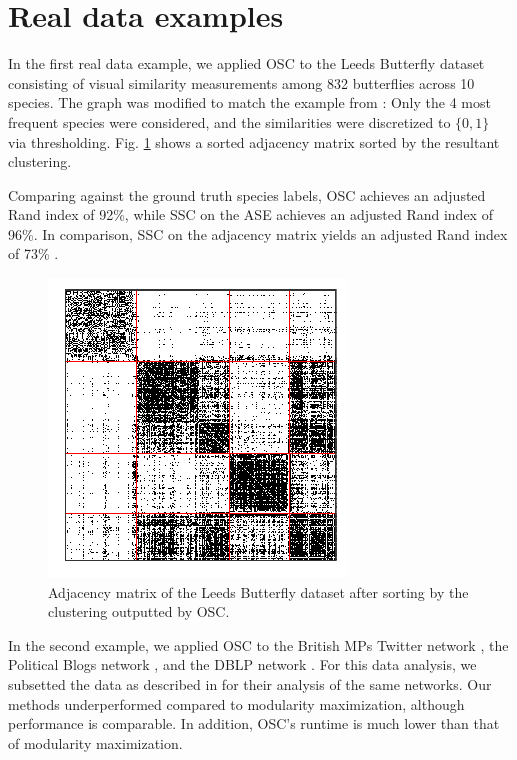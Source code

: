 \documentclass[12pt]{article}
\begin{document}
\hypertarget{real-data-examples}{%
\section{Real data examples}\label{real-data-examples}}

In the first real data example, we applied OSC to the Leeds Butterfly
dataset \cite{Wang_2018} consisting of visual similarity measurements
among 832 butterflies across 10 species. The graph was modified to match
the example from \cite{noroozi2019estimation}: Only the 4 most
frequent species were considered, and the similarities were discretized
to \(\{0, 1\}\) via thresholding. Fig. \ref{fig:butterfly} shows a
sorted adjacency matrix sorted by the resultant clustering.

Comparing against the ground truth species labels, OSC achieves an adjusted Rand index of 92\%, while SSC on the ASE achieves an adjusted Rand index of 96\%. In comparison, SSC on the adjacency matrix yields an adjusted Rand index of 73\% \citep{noroozi2019estimation}.

\begin{figure}[H]

{\centering \includegraphics{summary_files/figure-latex/butterfly-1}

}

\caption{Adjacency matrix of the Leeds Butterfly dataset after sorting by the clustering outputted by OSC.}\label{fig:butterfly}
\end{figure}

In the second example, we applied OSC to the British MPs Twitter network
\cite{greene2013producing}, the Political Blogs network
\cite{10.1145/1134271.1134277}, and the DBLP network
\cite{NIPS2009_3855, 10.1007/978-3-642-15880-3_42}. For this data
analysis, we subsetted the data as described in
\cite{307cbeb9b1be48299388437423d94bf1} for their analysis of the
same networks. Our methods underperformed compared to modularity
maximization, although performance is comparable. In addition, OSC's
runtime is much lower than that of modularity maximization.
\end{document}
